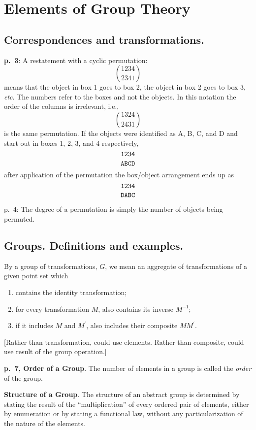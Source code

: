 \chapter{Elements of Group Theory}

\section{Correspondences and transformations.}

{\bf p.\ 3}: A restatement with a cyclic permutation:
$$
\genfrac(){0pt}0{1234}{2341}
$$
means that the object in box 1 goes to box 2, the object in box 2 goes
to box 3, {\it etc}. The numbers refer to the boxes and not the
objects. In this notation the order of the columns is irrelevant,
i.e.,
$$
\genfrac(){0pt}0{1324}{2431}
$$
is the same permutation.  If the objects were identified as A, B, C,
and D and start out in boxes 1, 2, 3, and 4 respectively,
$$
\genfrac{}{}{0pt}0{\tt 1234}{\tt ABCD}
$$
after application of the permutation the box/object arrangement ends up as
$$
\genfrac{}{}{0pt}0{\tt 1234}{\tt DABC}
$$

p.\ 4: The degree of a permutation is simply the number of objects
being permuted.

\section{Groups. Definitions and examples.}

By a group of transformations, $G$, we mean an aggregate of
transformations of a given point set which
\begin{enumerate}
\item contains the identity transformation;
\item for every transformation $M$, also contains its inverse $M^{-1}$;
\item if it includes $M$ and $M^\prime$, also includes their composite $MM^\prime$.
\end{enumerate}

[Rather than transformation, could use elements. Rather than
  composite, could use result of the group operation.]

{\bf p.\ 7, Order of a Group}. The number of elements in a group is
called the {\it order} of the group.

{\bf Structure of a Group}. The structure of an abstract group is
determined by stating the result of the ``multiplication'' of every
ordered pair of elements, either by enumeration or by stating a
functional law, without any particularization of the nature of the
elements.

